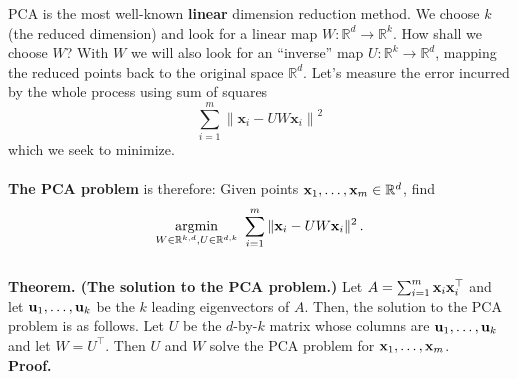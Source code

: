 \documentclass[11pt]{article}
\newcommand{\norm}[1]{\left\| #1\right\|}
\newcommand{\R}{\ensuremath{\mathbb{R}}}
\newcommand{\V}[1]{\mathbf{#1}}
\begin{document}
PCA is the most well-known {\bf linear} dimension reduction method. 
We choose $k$ (the reduced dimension) and  look
for a linear map $W:\R^d\to\R^k$. How shall we choose $W$? With $W$ we will also
look for an ``inverse'' map $U:\R^k\to\R^d$, mapping the reduced points back to
the original space $\R^d$. Let's measure the error incurred by the whole process
using sum of squares
\[
           \sum_{i=1}^m\norm{\V{x}_i - UW\V{x}_i}^2
         \]
which we seek to minimize.
\\~\\
{\bf The PCA problem} is therefore:
Given points $\x_1,\ldots,\x_m\in\R^d$, find
\[
  \operatorname*{argmin}_{W \in \mathbb{R}^{k,d}, U \in \mathbb{R}^{d,k}} \,\,\sum_{i=1}^m \|{\mathbf x}_i - U W
{\mathbf x}_i\|^2\,.
\]
~\\
{\bf Theorem. (The solution to the PCA problem.)}
Let $A = \sum_{i=1}^m {\mathbf x}_i {\mathbf x}_i^\top$ and let ${\mathbf u}_1,\ldots,{\mathbf u}_k$ be the $k$
leading eigenvectors of $A$. Then, the solution to the PCA problem is as
follows.  
Let $U$ be the $d$-by-$k$ matrix whose columns are 
${\mathbf u}_1,\ldots,{\mathbf u}_k$ and let $W = U^\top$. Then $U$ and $W$ solve the PCA
problem for ${\mathbf x}_1,\ldots,{\mathbf x}_m$.
~\\
{\bf Proof.}
\end{document}
